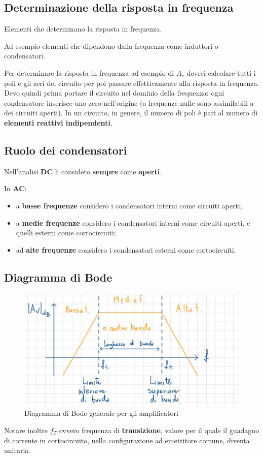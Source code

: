 \documentclass[11pt,a4paper,]{article}
\begin{document}
\subsection{Determinazione della risposta in frequenza}
\begin{definizione}
    Elementi che determinano la risposta in frequenza.
    \begin{nota}
        Ad esempio elementi che dipendono dalla frequenza come induttori o condensatori.
    \end{nota}
\end{definizione}
Per determinare la risposta in frequenza ad esempio di $A_v$ dovrei calcolare tutti i poli e gli zeri del circuito per poi passare effettivamente alla risposta in frequenza.
Devo quindi prima portare il circuito nel dominio della frequenza: ogni condensatore inserisce uno zero nell'origine (a frequenze nulle sono assimilabili a dei circuiti aperti).
In un circuito, in genere, il numero di poli è pari al numero di \textbf{elementi reattivi indipendenti}.

\subsection{Ruolo dei condensatori}
Nell'analisi \textbf{DC} li considero \textbf{sempre} come \textbf{aperti}.

\noindent In \textbf{AC}:
\begin{itemize}
    \item a \textbf{basse frequenze} considero i condensatori interni come circuiti aperti;
    \item a \textbf{medie frequenze} considero i condensatori interni come circuiti aperti, e quelli esterni come cortocircuiti;
    \item ad \textbf{alte frequenze} considero i condensatori esterni come cortocircuiti.
\end{itemize}
\subsection{Diagramma di Bode}
\begin{figure}[H]
    \centering
    \includegraphics[width=0.5\linewidth]{img/bode amp.png}
    \caption{Diagramma di Bode generale per gli amplificatori}
\end{figure}
Notare inoltre $f_T$ ovvero frequenza di \textbf{transizione}, valore per il quale il guadagno di corrente in cortocircuito, nella configurazione ad emettitore comune, diventa unitaria.
\end{document}
